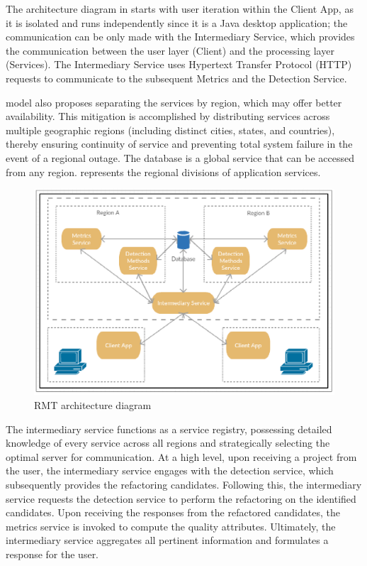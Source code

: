 The architecture diagram in  starts with user iteration within the Client App, as it is isolated and runs independently since it is a Java desktop application; the communication can be only made with the Intermediary Service, which provides the communication between the user layer (Client) and the processing layer (Services). The Intermediary Service uses Hypertext Transfer Protocol (HTTP) requests to communicate to the subsequent Metrics and the Detection Service.

\textcite{beluzzo2018abordagem} model also proposes separating the services by region, which may offer better availability. This mitigation is accomplished by distributing services across multiple geographic regions (including distinct cities, states, and countries), thereby ensuring continuity of service and preventing total system failure in the event of a regional outage. The database is a global service that can be accessed from any region.  represents the regional divisions of application services.

\begin{figure}[ht!]
\SetCaptionWidth{\textwidth}
\caption{RMT architecture diagram}
\label{fig-architecture}
\includegraphics[width =\textwidth]{Chapter-2/Figures/schema.png}
\end{figure}
\FloatBarrier

The intermediary service functions as a service registry, possessing detailed knowledge of every service across all regions and strategically selecting the optimal server for communication. At a high level, upon receiving a project from the user, the intermediary service engages with the detection service, which subsequently provides the refactoring candidates. Following this, the intermediary service requests the detection service to perform the refactoring on the identified candidates. Upon receiving the responses from the refactored candidates, the metrics service is invoked to compute the quality attributes. Ultimately, the intermediary service aggregates all pertinent information and formulates a response for the user.

